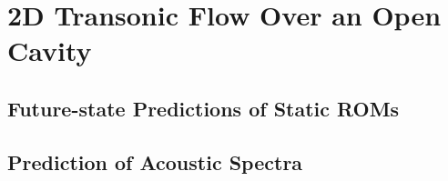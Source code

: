 \section{2D Transonic Flow Over an Open Cavity}\label{sec:cavity}

\subsection{Future-state Predictions of Static ROMs}

\subsection{Prediction of Acoustic Spectra}
